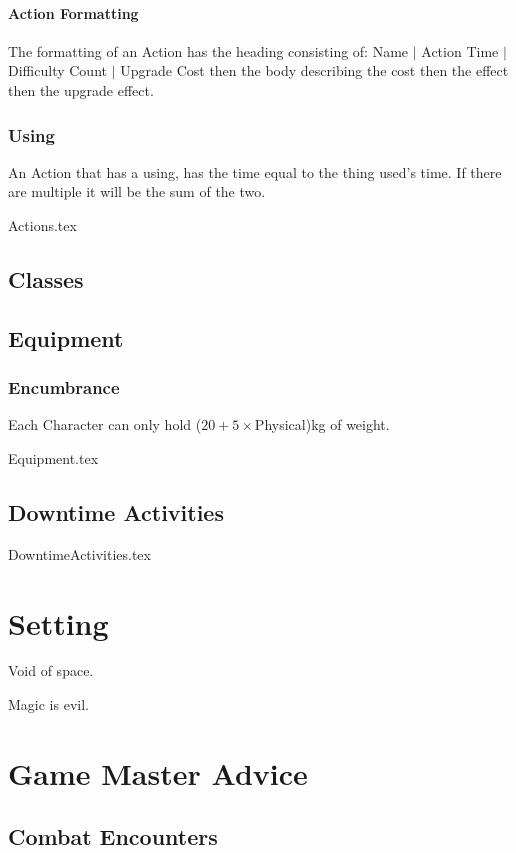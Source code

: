 \documentclass[a4paper,12pt,oneside]{book}
\begin{document}
            \subsubsection{Action Formatting}
                The formatting of an Action has the heading consisting of: Name $\vert$ Action Time $\vert$ Difficulty Count $\vert$ Upgrade Cost then the body describing the cost then the effect then the upgrade effect.

            \subsection{Using}
                An Action that has a using, has the time equal to the thing used's time. If there are multiple it will be the sum of the two.

            {Actions.tex}
                
        \section{Classes}
        \section{Equipment}
            \subsection{Encumbrance}
                Each Character can only hold ($20 + 5\times$Physical)kg of weight.

            {Equipment.tex}
        \section{Downtime Activities}
            {DowntimeActivities.tex}

    \chapter{Setting}
        Void of space.

        Magic is evil.

    \chapter{Game Master Advice}
        \section{Combat Encounters}
\end{document}
